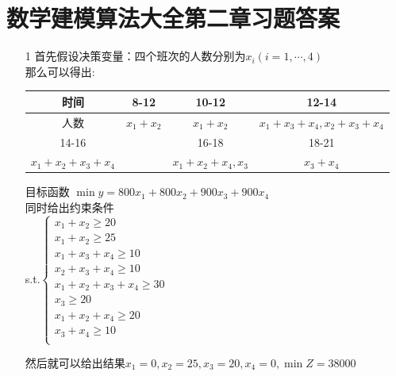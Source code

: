 \documentclass[a4paper,20pt]{article}
\begin{document}
\section{数学建模算法大全第二章习题答案}
\begin{itemize}
    \item[1]首先假设决策变量：四个班次的人数分别为$x_i(i=1,\cdots,4)$
    \\那么可以得出:\begin{table}[H]
        \begin{tabular}{|c|c|c|c|}
            \hline
            时间              & 8-12      & 10-12             & 12-14                     \\
            \hline
            人数              & $x_1+x_2$ & $x_1+x_2$         & $x_1+x_3+x_4,x_2+x_3+x_4$ \\
            \hline
            14-16             &           & 16-18             & 18-21                     \\
            \hline
            $x_1+x_2+x_3+x_4$ &           & $x_1+x_2+x_4,x_3$ & $x_3+x_4$                 \\
            \hline
        \end{tabular}
    \end{table}
    \par \noindent

    目标函数 $\min y = 800x_1 + 800x_2+900x_3+900x_4$
    \\同时给出约束条件
    \\s.t.$\left\{\begin{matrix}
            x_1+x_2 \geqslant  20         \\
            x_1+x_2 \geqslant  25         \\
            x_1+x_3+x_4 \geqslant  10     \\
            x_2+x_3+x_4 \geqslant  10     \\
            x_1+x_2+x_3+x_4 \geqslant  30 \\
            x_3 \geqslant 20              \\
            x_1+x_2+x_4 \geqslant  20     \\
            x_3+x_4 \geqslant  10         \\
        \end{matrix}\right.$

    \par \noindent 然后就可以给出结果$ x_1=0
        ,x_2=25
        ,x_3=20
        ,x_4=0,\min Z=38000$
\end{itemize}
\end{document}
